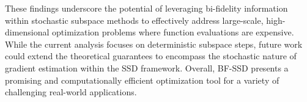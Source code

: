 \documentclass[10pt]{article} %
\numberwithin{equation}{section}
\theoremstyle{plain}
\theoremstyle{definition}
\newcommand{\<}{\langle}
\renewcommand{\>}{\rangle}
\renewcommand{\(}{\left(}
\renewcommand{\)}{\right)}
\renewcommand{\[}{\left[}
\renewcommand{\]}{\right]}
\begin{document}
These findings underscore the potential of leveraging bi-fidelity information within stochastic subspace methods to effectively address large-scale, high-dimensional optimization problems where function evaluations are expensive. While the current analysis focuses on deterministic subspace steps, future work could extend the theoretical guarantees to encompass the stochastic nature of gradient estimation within the SSD framework. Overall, BF-SSD presents a promising and computationally efficient optimization tool for a variety of challenging real-world applications.



% 
% 





\newpage
\appendix
\end{document}
